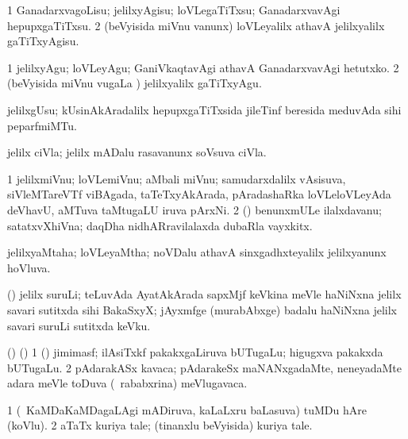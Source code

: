 \bentry
{}
\gl{\kirx}
\bmng
\emng

\noindent
\gl{\sakirx}
\bmng
\bnum
\num{1} GanadarxvagoLisu; jelilxyAgisu; loVLegaTiTxsu; GanadarxvavAgi hepupxgaTiTxsu. 
\num{2} (beVyisida miVnu \mo vanunx) loVLeyalilx athavA jelilxyalilx gaTiTxyAgisu. 
\enum
\emng

\noindent
\gl{\akirx}
\bmng
\bnum
\num{1} jelilxyAgu; loVLeyAgu; GaniVkaqtavAgi athavA GanadarxvavAgi hetutxko. 
\num{2} (beVyisida miVnu \mo vugaLa \vi) jelilxyalilx gaTiTxyAgu. 
\enum
\emng
\eentry

\bentry
{} 
\gl{\nA}
\bmng
jelilxgUsu; kUsinAkAradalilx hepupxgaTiTxsida jileTinf beresida meduvAda sihi peparfmiMTu. 
\emng
\eentry

\bentry
{}
\gl{\nA}
\bmng
jelilx ciVla; jelilx mADalu rasavanunx soVsuva ciVla. 
\emng
\eentry

\bentry
{}
\gl{\nA}
\bmng
{} 
\bnum
\num{1} jelilxmiVnu; loVLemiVnu; aMbali miVnu; samudarxdalilx vAsisuva, siVleMTareVTf viBAgada, taTeTxyAkArada, pAradashaRka loVLeloVLeyAda deVhavU, aMTuva taMtugaLU iruva pArxNi.   
\num{2} (\AmA) benunxmULe ilalxdavanu; satatxvXhiVna; daqDha nidhARravilalaxda dubaRla vayxkitx. 
\enum
\emng
\eentry

\bentry
{}
\gl{\gu}
\bmng
jelilxyaMtaha; loVLeyaMtha; noVDalu athavA sinxgadhxteyalilx jelilxyanunx hoVluva. 
\emng
\eentry

\bentry
{}
\gl{\nA}
\bmng
(\ame) jelilx suruLi; teLuvAda AyatAkArada sapxMjf keVkina meVle haNiNxna jelilx savari sutitxda sihi BakaSxyX; jAyxmfge (murabAbxge) badalu haNiNxna jelilx savari suruLi sutitxda keVku. 
\emng
\eentry

\bentry
{}
\gl{\nA}
\bmng
(\birx) (\bava) 
\bnum
\num{1} (\AmA) jimimasf; ilAsiTxkf pakakxgaLiruva bUTugaLu; higugxva pakakxda bUTugaLu. 
\num{2} pAdarakASx kavaca; pAdarakeSx maNANxgadaMte, neneyadaMte adara meVle toDuva (\sA\ rababxrina) meVlugavaca. 
\enum
\emng
\eentry

\bentry
{}
\gl{\nA}
\bmng
\bnum
\num{1} (\sA\ KaMDaKaMDagaLAgi mADiruva, kaLaLxru baLasuva) tuMDu hAre (koVlu). 
\num{2} aTaTx kuriya tale; (tinanxlu beVyisida) kuriya tale. 
\enum
\emng
\eentry


